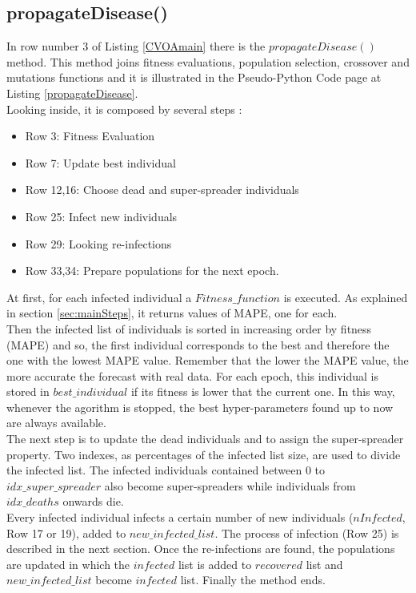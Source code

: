 \documentclass[letterpaper]{article}%
\begin{document}
\subsection{propagateDisease()}
In row number 3 of Listing \ref{CVOAmain} there is the $propagateDisease()$ method. This method joins fitness evaluations, population selection, crossover and mutations functions and it is illustrated in the Pseudo-Python Code page at Listing \ref{propagateDisease}.\\
Looking inside, it is composed by several steps :
\begin{itemize}
\item Row 3: Fitness Evaluation  
\item Row 7: Update best individual
\item Row 12,16: Choose dead and super-spreader individuals
\item Row 25: Infect new individuals
\item Row 29: Looking re-infections
\item Row 33,34: Prepare populations for the next epoch.
\end{itemize}
At first, for each infected individual a $Fitness\_function$ is executed. As explained in section \ref{sec:mainSteps}, it returns values of MAPE, one for each.\\ %
Then the infected list of individuals is sorted in increasing order by fitness (MAPE) and so, the first individual corresponds to the best and therefore the one with the lowest MAPE value. Remember that the lower the MAPE value, the more accurate the forecast with real data.
For each epoch, this individual is stored in $best\_individual$ if its fitness is lower that the current one. In this way, whenever the agorithm is stopped, the best hyper-parameters found up to now are always available.\\
The next step is to update the dead individuals and to assign the super-spreader property. Two indexes, as percentages of the infected list size, are used to divide the infected list. The infected individuals contained between $0$ to $idx\_super\_spreader$ also become super-spreaders while individuals from $idx\_deaths$ onwards die.\\
Every infected individual infects a certain number of new individuals ($nInfected$, Row 17 or 19), added to $new\_infected\_list$. The process of infection (Row 25) is described in the next section. Once the re-infections are found, the populations are updated in which the $infected$ list is added to $recovered$ list and $new\_infected\_list$ become $infected$ list. Finally the method ends.
\end{document}
